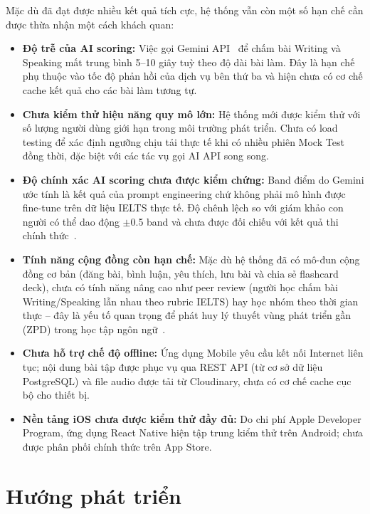 Mặc dù đã đạt được nhiều kết quả tích cực, hệ thống vẫn còn một số hạn chế cần được thừa nhận một cách khách quan:

\begin{itemize}
    \item \textbf{Độ trễ của AI scoring:} Việc gọi Gemini API~\cite{gemini-api} để chấm bài Writing và Speaking mất trung bình 5--10 giây tuỳ theo độ dài bài làm. Đây là hạn chế phụ thuộc vào tốc độ phản hồi của dịch vụ bên thứ ba và hiện chưa có cơ chế cache kết quả cho các bài làm tương tự.

    \item \textbf{Chưa kiểm thử hiệu năng quy mô lớn:} Hệ thống mới được kiểm thử với số lượng người dùng giới hạn trong môi trường phát triển. Chưa có load testing để xác định ngưỡng chịu tải thực tế khi có nhiều phiên Mock Test đồng thời, đặc biệt với các tác vụ gọi AI API song song.

    \item \textbf{Độ chính xác AI scoring chưa được kiểm chứng:} Band điểm do Gemini ước tính là kết quả của prompt engineering chứ không phải mô hình được fine-tune trên dữ liệu IELTS thực tế. Độ chênh lệch so với giám khảo con người có thể dao động $\pm$0.5 band và chưa được đối chiếu với kết quả thi chính thức~\cite{bachman1990fundamental}.

    \item \textbf{Tính năng cộng đồng còn hạn chế:} Mặc dù hệ thống đã có mô-đun cộng đồng cơ bản (đăng bài, bình luận, yêu thích, lưu bài và chia sẻ flashcard deck), chưa có tính năng nâng cao như peer review (người học chấm bài Writing/Speaking lẫn nhau theo rubric IELTS) hay học nhóm theo thời gian thực -- đây là yếu tố quan trọng để phát huy lý thuyết vùng phát triển gần (ZPD) trong học tập ngôn ngữ~\cite{vygotsky1978mind}.

    \item \textbf{Chưa hỗ trợ chế độ offline:} Ứng dụng Mobile yêu cầu kết nối Internet liên tục; nội dung bài tập được phục vụ qua REST API (từ cơ sở dữ liệu PostgreSQL) và file audio được tải từ Cloudinary, chưa có cơ chế cache cục bộ cho thiết bị.

    \item \textbf{Nền tảng iOS chưa được kiểm thử đầy đủ:} Do chi phí Apple Developer Program, ứng dụng React Native hiện tập trung kiểm thử trên Android; chưa được phân phối chính thức trên App Store.
\end{itemize}

\section{Hướng phát triển}

